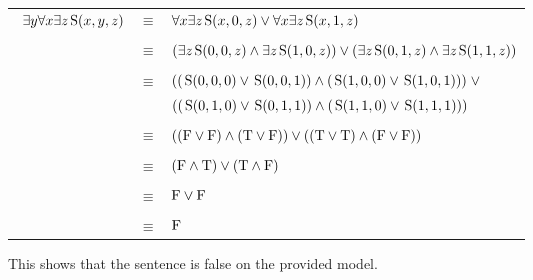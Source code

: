 \documentclass{article}
\newcommand{\True}{\textnormal{T}}
\newcommand{\False}{\textnormal{F}}
\newcommand{\predS}{\hspace{0.05cm} \textnormal{S}}
\newcommand{\predicate}{\predS (x,y,z)}
\begin{document}
\begin{enumerate}
{\begin{center}
    $ $
    \end{center}
    }
    {
    \begin{center}\begin{tabular}{ccl}\
    $\exists y \forall x \exists z \predicate$ & $\equiv$ & $\forall x \exists z \predS(x,0,z) \lor \forall x \exists z \predS(x,1,z)$ \\ \\
    
    & $\equiv$ & $(\exists z \predS(0,0,z) \land \exists z \predS(1,0,z)) \lor (\exists z \predS(0,1,z) \land \exists z \predS(1,1,z))$ \\ \\
    
    & $\equiv$ & $((\predS(0,0,0) \lor \predS(0,0,1)) \land (\predS(1,0,0) \lor \predS(1,0,1))) \hspace{0.1cm} \lor$ \\
    & & $((\predS(0,1,0) \lor \predS(0,1,1)) \land (\predS(1,1,0) \lor \predS(1,1,1)))$ \\ \\
    
    & $\equiv$ & $((\False \lor \False) \land (\True \lor \False)) \lor ((\True \lor \True) \land (\False \lor \False))$ \\ \\
    
    & $\equiv$ & $(\False \land \True) \lor (\True \land \False)$ \\ \\
    
    & $\equiv$ & $\False \lor \False$ \\ \\
    
    & $\equiv$ & $\False$ \\ 
    \end{tabular}\end{center}
    This shows that the sentence is false on the provided model.
    }  
\end{enumerate}

\pagebreak
\printbibliography
\end{document}
